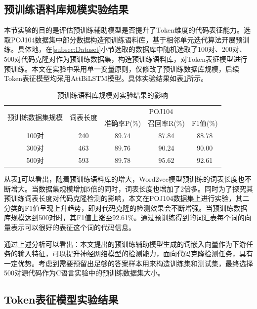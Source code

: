 \subsection{预训练语料库规模实验结果}
\label{subsec:TokenResult1}

本节实验的目的是评估预训练辅助模型是否提升了Token维度的代码表征能力。选取POJ104数据集中部分数据构造预训练语料库，基于相邻单元迭代算法开展预训练。具体地，在\ref{subsec:Dataset}小节选取的数据库中随机选取了100对、200对、500对代码克隆对作为预训练数据集，构造预训练语料库，对Token表征模型进行预训练。本文在实验中采用单一变量原则，仅修改了预训练数据库规模，后续Token表征模型均采用AttBiLSTM模型。具体实验结果如表\ref{tab:category}所示。

\begin{table}[htp]
  \centering  
  \caption{预训练语料库规模对实验结果的影响}   
  \label{tab:category}  
  \begin{tabular*}{0.9\textwidth}{@{\extracolsep{\fill}}ccccc}  
  \toprule
  \multirow{2}{*}{预训练数据集规模} & \multirow{2}{*}{词表长度} & \multicolumn{3}{c}{POJ104} \\
  \cmidrule{3-5} 
   & & 准确率P(\%) & 召回率R(\%) & F1值(\%)  \\  
  \midrule 
  100对	&240		& 89.74	& 87.84	& 88.78		 \\  
  300对	&463		& 89.76	& 90.24	& 90.00	 \\  
  500对	&593 	  & 89.78	& 95.62	& 92.61	   \\  
  \bottomrule  
  \end{tabular*}  
\end{table}

从表\ref{tab:category}可以看出，随着预训练语料库的增大，Word2vec模型预训练的词表长度也不断增大。当数据集规模增加5倍的同时，词表长度也增加了2倍多。同时为了探究其预训练词表长度对代码克隆检测的影响，本文在POJ104数据集上进行实验，其二分类的F1值呈现上升趋势，即对代码克隆的检测效果会不断增强。当预训练数据库规模达到500对时，其F1值上涨至92.61\%。通过预训练得到的词汇表每个词的向量表示可以很好的表征这个词的代码信息。

通过上述分析可以看出：本文提出的预训练辅助模型生成的词嵌入向量作为下游任务的输入特征，可以提升神经网络模型的检测能力，面向代码克隆检测任务，具有一定优势。考虑到需要预留出足够的答案样本用来构造训练集和测试集，最终选择500对源代码作为C语言实验中的预训练数据集大小。

\subsection{Token表征模型实验结果}
\label{subsec:TokenResult2}

